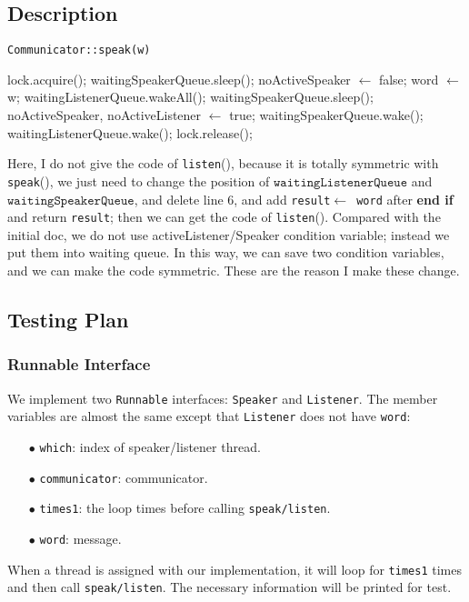 \documentclass{article}
\begin{document}
\begin{spacing}{1.1}
\subsection{Description}

\begin{algorithm}[htbp]
  \caption{\texttt{Communicator::speak(w)}}
  \begin{algorithmic}[1]
    \State lock.acquire();
    \State waitingSpeakerQueue.sleep();
    \EndWhile
    \State noActiveSpeaker $\leftarrow$ false;
    \State word $\leftarrow$ w;
    {\color{red}
    \State waitingListenerQueue.wakeAll();
    \Else
    \State waitingSpeakerQueue.sleep();
    \State noActiveSpeaker, noActiveListener $\leftarrow$ true;
    \State waitingSpeakerQueue.wake();
    \State waitingListenerQueue.wake();
    \EndIf}
    \State lock.release();
  \end{algorithmic}
\end{algorithm}
{\color{red} Here, I do not give the code of \texttt{listen}(), because it is totally symmetric with
\texttt{speak}(), we just need to change the position of $\texttt{waitingListenerQueue}$ and 
$\texttt{waitingSpeakerQueue}$, and delete line 6, and add \texttt{result$\leftarrow$ word} after
\textbf{end if} and return \texttt{result}; then we can get the code of \texttt{listen}().
Compared with the initial doc, we do not use activeListener/Speaker condition variable; instead we put them into waiting
queue. In this way, we can save two condition variables, and we can make the code symmetric. These are
the reason I make these change.}

\subsection{Testing Plan}
\subsubsection{Runnable Interface}
We implement two \texttt{Runnable} interfaces: \texttt{Speaker} and \texttt{Listener}. The member variables
are almost the same except that \texttt{Listener} does not have \texttt{word}:
\begin{enumerate}
  \item[$\bullet$] \texttt{which}: index of speaker/listener thread.
  \item[$\bullet$] \texttt{communicator}: communicator.
  \item[$\bullet$] \texttt{times1}: the loop times before calling \texttt{speak/listen}.
  \item[$\bullet$] \texttt{word}: message.
\end{enumerate}
When a thread is assigned with our implementation, it will loop for \texttt{times1} times and then call
\texttt{speak/listen}. The necessary information will be printed for test.

\end{spacing}
\end{document}
